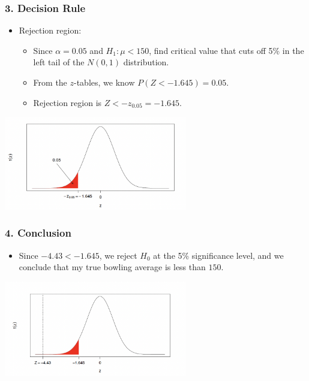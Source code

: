 \documentclass[12pt]{beamer}
\begin{document}
\begin{frame}
	\frametitle{3. Decision Rule}
	
	\begin{itemize}[label={\color{blue}$\blacktriangleright$}]
		\item Rejection region:
		\begin{itemize}[label={\color{blue}$\blacktriangleright$}]
			\item Since $\alpha = 0.05$ and $H_1 : \mu < 150$, find critical value that cuts off 5\% in the left tail of the $N(0,1)$ distribution.
			\item From the $z$-tables, we know $P(Z < -1.645) = 0.05$.
			\item Rejection region is $Z < -z_{0.05} = -1.645$.
		\end{itemize}
	\end{itemize}
\vspace{0.7cm}
\centering
\includegraphics[width=8cm]{test2.png}	

\end{frame}
\begin{frame}
	\frametitle{4. Conclusion}
	
	\begin{itemize}[label={\color{blue}$\blacktriangleright$}]
		\item Since $-4.43 < -1.645$, we reject $H_0$ at the 5\% significance level, and we conclude that my true bowling average is less than $150$.
	\end{itemize}
	\vspace{0.7cm}
	\centering
	\includegraphics[width=8cm]{test3.png}	
	
\end{frame}
\end{document}
